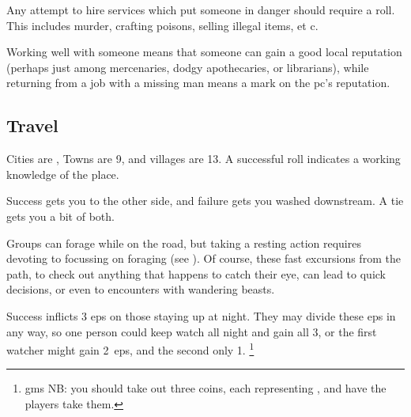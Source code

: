 \begin{multicols}{2}

Any attempt to hire services which put someone in danger should require a roll.
This includes murder, crafting poisons, selling illegal items, et c.

Working well with someone means that someone can gain a good local reputation (perhaps just among mercenaries, dodgy apothecaries, or librarians), while returning from a job with a missing man means a mark on the \gls{pc}'s reputation.

\subsection{Travel}

Cities are \tn[7], Towns are 9, and \glspl{village} are 13.
A successful roll indicates a working knowledge of the place.

Success gets you to the other side, and failure gets you washed downstream.
A tie gets you a bit of both.


Groups can forage while on the road, but taking a resting action requires devoting  to focussing on foraging (see ).
Of course, these fast excursions from the path, to check out anything that happens to catch their eye, can lead to quick decisions, or even to encounters with wandering beasts.

\gatheringChart

Success inflicts 3 \glspl{ep} on those staying up at night.
They may divide these \glspl{ep} in any way, so one person could keep watch all night and gain all 3, or the first watcher might gain 2~\glspl{ep}, and the second only 1.%
\footnote{\Glspl{gm} NB: you should take out three coins, each representing , and have the players take them.}


\end{multicols}
